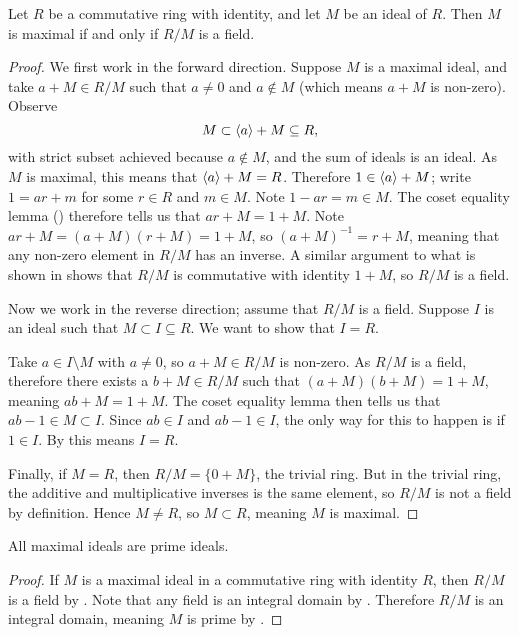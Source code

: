 \begin{theorem}\label{thrm-maximal-ideal-iff-quotient-ring-is-field}
    Let $R$ be a commutative ring with identity, and let $M$ be an ideal of $R$. Then $M$ is maximal if and only if $R/M$ is a field.
\end{theorem}
\begin{proof}
    We first work in the forward direction. Suppose $M$ is a maximal ideal, and take $a + M \in R/M$ such that $a \neq 0$ and $a \notin M$ (which means $a + M$ is non-zero). Observe
    \[
        M \subset \left\langle a\right\rangle + M \subseteq R,
    \]
    with strict subset achieved because $a \notin M$, and the sum of ideals is an ideal. As $M$ is maximal, this means that $\left\langle a\right\rangle + M = R$. Therefore $1 \in \left\langle a\right\rangle + M$; write $1 = ar + m$ for some $r \in R$ and $m \in M$. Note $1-ar = m \in M$. The coset equality lemma () therefore tells us that $ar + M = 1 + M$. Note $ar + M = (a+M)(r+M) = 1 + M$, so $(a+M)^{-1} = r+M$, meaning that any non-zero element in $R/M$ has an inverse. A similar argument to what is shown in  shows that $R/M$ is commutative with identity $1 + M$, so $R/M$ is a field.

    Now we work in the reverse direction; assume that $R/M$ is a field. Suppose $I$ is an ideal such that $M \subset I \subseteq R$. We want to show that $I = R$.

    Take $a \in I \setminus M$ with $a \neq 0$, so $a + M \in R/M$ is non-zero. As $R/M$ is a field, therefore there exists a $b + M \in R/M$ such that $(a+M)(b+M) = 1 + M$, meaning $ab+M = 1+M$. The coset equality lemma then tells us that $ab - 1 \in M \subset I$. Since $ab \in I$ and $ab - 1 \in I$, the only way for this to happen is if $1 \in I$. By  this means $I = R$.

    Finally, if $M = R$, then $R/M = \{0 + M\}$, the trivial ring. But in the trivial ring, the additive and multiplicative inverses is the same element, so $R/M$ is not a field by definition. Hence $M \neq R$, so $M \subset R$, meaning $M$ is maximal.
\end{proof}

\begin{theorem}\label{thrm-all-maximal-ideals-are-prime-ideals}
    All maximal ideals are prime ideals.
\end{theorem}
\begin{proof}
    If $M$ is a maximal ideal in a commutative ring with identity $R$, then $R/M$ is a field by . Note that any field is an integral domain by . Therefore $R/M$ is an integral domain, meaning $M$ is prime by .
\end{proof}

